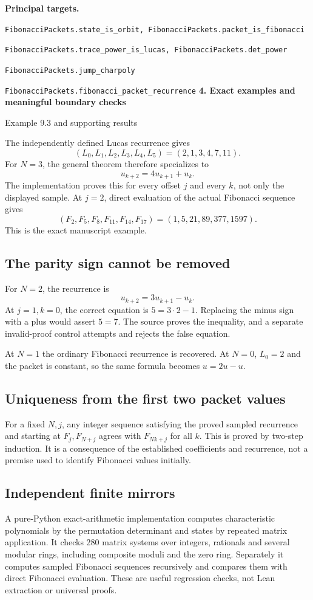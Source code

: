 \documentclass[11pt]{article}
\newcommand{\target}[1]{{\footnotesize\texttt{#1}}}
\newcommand{\pageheading}[2]{{\Large\bfseries\color{ink}#1}\par{\small #2}\par\medskip}
\begin{document}
\textbf{Principal targets.}\par
\target{FibonacciPackets.state\_is\_orbit, FibonacciPackets.packet\_is\_fibonacci}\par
\target{FibonacciPackets.trace\_power\_is\_lucas, FibonacciPackets.det\_power}\par
\target{FibonacciPackets.jump\_charpoly}\par
\target{FibonacciPackets.fibonacci\_packet\_recurrence}
\newpage
\pageheading{4. Exact examples and meaningful boundary checks}{Example 9.3 and supporting results}
The independently defined Lucas recurrence gives
\[
 (L_0,L_1,L_2,L_3,L_4,L_5)=(2,1,3,4,7,11).
\]
For $N=3$, the general theorem therefore specializes to
\[
 u_{k+2}=4u_{k+1}+u_k.
\]
The implementation proves this for every offset $j$ and every $k$, not only the displayed sample. At $j=2$, direct evaluation of the actual Fibonacci sequence gives
\[
 (F_2,F_5,F_8,F_{11},F_{14},F_{17})=(1,5,21,89,377,1597).
\]
This is the exact manuscript example.

\subsection*{The parity sign cannot be removed}
For $N=2$, the recurrence is
\[
 u_{k+2}=3u_{k+1}-u_k.
\]
At $j=1,k=0$, the correct equation is $5=3\cdot2-1$. Replacing the minus sign with a plus would assert $5=7$. The source proves the inequality, and a separate invalid-proof control attempts and rejects the false equation.

At $N=1$ the ordinary Fibonacci recurrence is recovered. At $N=0$, $L_0=2$ and the packet is constant, so the same formula becomes $u=2u-u$.

\subsection*{Uniqueness from the first two packet values}
For a fixed $N,j$, any integer sequence satisfying the proved sampled recurrence and starting at $F_j,F_{N+j}$ agrees with $F_{Nk+j}$ for all $k$. This is proved by two-step induction. It is a consequence of the established coefficients and recurrence, not a premise used to identify Fibonacci values initially.

\subsection*{Independent finite mirrors}
A pure-Python exact-arithmetic implementation computes characteristic polynomials by the permutation determinant and states by repeated matrix application. It checks 280 matrix systems over integers, rationals and several modular rings, including composite moduli and the zero ring. Separately it computes sampled Fibonacci sequences recursively and compares them with direct Fibonacci evaluation. These are useful regression checks, not Lean extraction or universal proofs.
\end{document}
